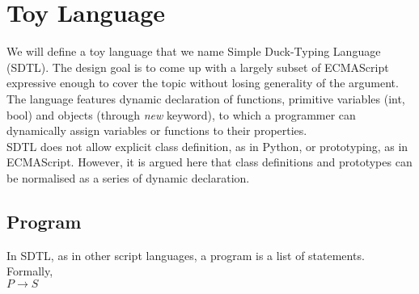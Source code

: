 \documentclass[a4paper,12pt]{article}
\begin{document}
\section{Toy Language}
We will define a toy language that we name Simple Duck-Typing Language (SDTL). The design goal is to come up with a largely subset of ECMAScript expressive enough to cover the topic without losing generality of the argument. The language features dynamic declaration of functions, primitive variables (int, bool) and objects (through \textit{new} keyword), to which a programmer can dynamically assign variables or functions to their properties.\\
SDTL does not allow explicit class definition, as in Python, or prototyping, as in ECMAScript. However, it is argued here that class definitions and prototypes can be normalised as a series of dynamic declaration.\\

\subsection{Program}
In SDTL, as in other script languages, a program is a list of statements. Formally,\\
$P \rightarrow S$\\
\end{document}
